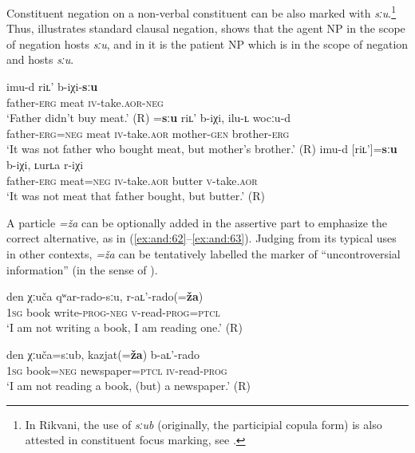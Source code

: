\documentclass[output=paper,colorlinks=true, citecolor=brown]{langscibook}
\begin{document}
Constituent negation on a non-verbal constituent can be also marked with \textit{sːu}.\footnote{In Rikvani, the use of \textrm{\textit{sːub}} (originally, the participial copula form) is also attested in constituent focus marking, see .} Thus,  illustrates standard clausal negation,  shows that the agent NP in the scope of negation hosts \textit{sːu}, and in  it is the patient NP which is in the scope of negation and hosts \textit{sːu}.

\ea\label{ex:and:61} 
    \ea\label{ex:and:61a}
        \gll  imu-d riʟ’ b-iχi-\textbf{sːu}\\ 
               father-\textsc{erg} meat \textsc{iv-}take.\textsc{aor-neg} \\
        \glt ‘Father didn’t buy meat.’ (R)
    \ex\label{ex:and:61b} 
        \gll  [imu-d]=\textbf{sːu} riʟ’ b-iχi, ilu-ʟ wocːu-d\\
               father-\textsc{erg=neg} meat \textsc{iv-}take.\textsc{aor} mother-\textsc{gen} brother-\textsc{erg} \\
        \glt ‘It was not father who bought meat, but mother’s brother.’ (R)
    \ex\label{ex:and:61c}
        \gll  imu-d [riʟ’]=\textbf{sːu} b-iχi, ʟurʟa r-iχi\\
                 father-\textsc{erg} meat=\textsc{neg} \textsc{iv-}take.\textsc{aor} butter \textsc{v-}take.\textsc{aor} \\
        \glt ‘It was not meat that father bought, but butter.’ (R)
    \z
\z 

A particle \textit{=ža} can be optionally added in the assertive part to emphasize the correct alternative, as in (\ref{ex:and:62}–\ref{ex:and:63}). Judging from its typical uses in other contexts, \textit{=ža} can be tentatively labelled the marker of “uncontroversial information” (in the sense of \citealt{Panov2020}).

\ea
    \label{ex:and:62}
    \gll den χːuča qʷar-rado-sːu, r-aʟ’-rado(=\textbf{ža})\\
          \textsc{1sg} book write-\textsc{prog-neg} \textsc{v-}read-\textsc{prog=ptcl} \\
    \glt ‘I am not writing a book, I am reading one.’ (R)
\z 

\ea
    \label{ex:and:63}
    \gll den χːuča=sːub, kazjat(=\textbf{ža}) b-aʟ’-rado\\
          \textsc{1sg} book=\textsc{neg} newspaper=\textsc{ptcl} \textsc{iv}{}-read-\textsc{prog} \\
    \glt ‘I am not reading a book, (but) a newspaper.’ (R)
\z 
\end{document}
